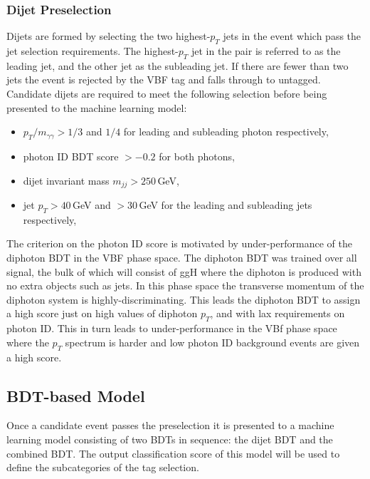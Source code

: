 \subsubsection{Dijet Preselection}
Dijets are formed by selecting the two highest-$p_T$ jets in the event which pass the jet selection requirements. The highest-$p_T$ jet in the pair is referred to as the leading jet, and the other jet as the subleading jet. If there are fewer than two jets the event is rejected by the VBF tag and falls through to untagged. 
Candidate dijets are required to meet the following selection before being presented to the machine learning model:
\begin{itemize}[leftmargin=.5in,noitemsep]
    \item $p_{T}/m_{\gamma\gamma} > 1/3$ and $1/4$ for leading and subleading photon respectively,
    \item photon ID BDT score $> -0.2$ for both photons,
    \item dijet invariant mass $m_{jj} > 250$\,GeV,
    \item jet $p_{T} > 40$\,GeV and $> 30$\,GeV for the leading and subleading jets respectively,
\end{itemize}

The criterion on the photon ID score is motivated by under-performance of the diphoton BDT in the VBF phase space. 
The diphoton BDT was trained over all signal, the bulk of which will consist of ggH where the diphoton is produced with no extra objects such as jets. 
In this phase space the transverse momentum of the diphoton system is highly-discriminating. 
This leads the diphoton BDT to assign a high score just on high values of diphoton $p_T$, and with lax requirements on photon ID. 
This in turn leads to under-performance in the VBf phase space where the $p_T$ spectrum is harder and low photon ID background events are given a high score. 








\subsection{BDT-based Model}
Once a candidate event passes the preselection it is presented to a machine learning model consisting of two BDTs in sequence: the dijet BDT and the combined BDT. 
The output classification score of this model will be used to define the subcategories of the tag selection. 

